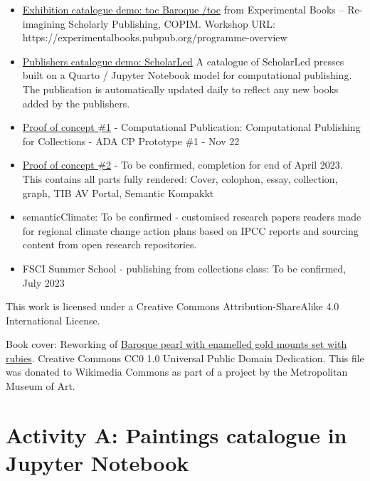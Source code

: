 \documentclass[
  letterpaper,
]{book}
\begin{document}
\begin{itemize}
\item
  \href{https://nfdi4culture.github.io/experimental-books-workshop/}{Exhibition
  catalogue demo: toc Baroque /toc} from Experimental Books --
  Re-imagining Scholarly Publishing, COPIM. Workshop URL:
  https://experimentalbooks.pubpub.org/programme-overview
\item
  \href{https://nfdi4culture.github.io/experimental-books-workshop/}{Publishers
  catalogue demo: ScholarLed} A catalogue of ScholarLed presses built on
  a Quarto / Jupyter Notebook model for computational publishing. The
  publication is automatically updated daily to reflect any new books
  added by the publishers.
\item
  \href{https://nfdi4culture.github.io/cp4c/}{Proof of concept \#1} -
  Computational Publication: Computational Publishing for Collections -
  ADA CP Prototype \#1 - Nov 22
\item
  \href{https://nfdi4culture.github.io/art_catalogue_test/}{Proof of
  concept \#2} - To be confirmed, completion for end of April 2023. This
  contains all parts fully rendered: Cover, colophon, essay, collection,
  graph, TIB AV Portal, Semantic Kompakkt
\item
  semanticClimate: To be confirmed - customised research papers readers
  made for regional climate change action plans based on IPCC reports
  and sourcing content from open research repositories.
\item
  FSCI Summer School - publishing from collections class: To be
  confirmed, July 2023
\end{itemize}

This work is licensed under a Creative Commons Attribution-ShareAlike
4.0 International License.

Book cover: Reworking of
\href{https://en.wikipedia.org/wiki/File:Pendant_in_the_form_of_a_siren_MET_DT7173.jpg}{Baroque
pearl with enamelled gold mounts set with rubies}. Creative Commons CC0
1.0 Universal Public Domain Dedication. This file was donated to
Wikimedia Commons as part of a project by the Metropolitan Museum of
Art.


\hypertarget{activity-a-paintings-catalogue-in-jupyter-notebook}{%
\chapter{Activity A: Paintings catalogue in Jupyter
Notebook}\label{activity-a-paintings-catalogue-in-jupyter-notebook}}
\end{document}
